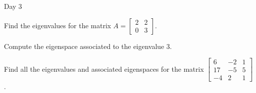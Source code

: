 \begin{applicationActivities}{Day 3}
\begin{activity}{0}
Find the eigenvalues for the matrix $A = \begin{bmatrix} 2 & 2 \\ 0 & 3 \end{bmatrix}$.
\end{activity}

\begin{activity}{0}
  Compute the eigenspace associated to the eigenvalue $3$.
\end{activity}

\begin{activity}{0}
  Find all the eigenvalues and associated eigenspaces for the matrix $\begin{bmatrix} 6 & -2 & 1 \\ 17 & -5 & 5 \\ -4 & 2 & 1 \end{bmatrix}$.
\end{activity}

\end{applicationActivities}

